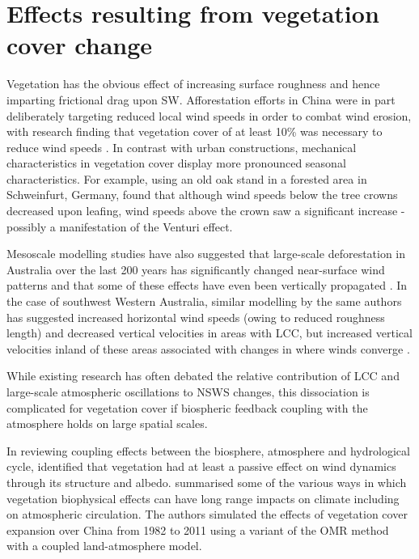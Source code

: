 \section{Effects resulting from vegetation cover change}

Vegetation has the obvious effect of increasing surface roughness and hence imparting frictional drag upon \ac{SW}. Afforestation efforts in China were in part deliberately targeting reduced local wind speeds in order to combat wind erosion, with research finding that vegetation cover of at least 10\% was necessary to reduce wind speeds \citep{jiang2019}. In contrast with urban constructions, mechanical characteristics in vegetation cover display more pronounced seasonal characteristics. For example, using an old oak stand in a forested area in Schweinfurt, Germany, \citet{geiger1950} found that although wind speeds below the tree crowns decreased upon leafing, wind speeds above the crown saw a significant increase - possibly a manifestation of the Venturi effect.

Mesoscale modelling studies have also suggested that large-scale deforestation in Australia over the last 200 years has significantly changed near-surface wind patterns and that some of these effects have even been vertically propagated \citep{narisma2003}. In the case of southwest Western Australia, similar modelling by the same authors has suggested increased horizontal wind speeds (owing to reduced roughness length) and decreased vertical velocities in areas with \ac{LCC}, but increased vertical velocities inland of these areas associated with changes in where winds converge \citep{pitman2004}.

While existing research has often debated the relative contribution of \ac{LCC} and large-scale atmospheric oscillations to NSWS changes, this dissociation is complicated for vegetation cover if biospheric feedback coupling with the atmosphere holds on large spatial scales.

In reviewing coupling effects between the biosphere, atmosphere and hydrological cycle, \citet{hutjes1998} identified that vegetation had at least a passive effect on wind dynamics through its structure and albedo. \citet{li2020} summarised some of the various ways in which vegetation biophysical effects can have long range impacts on climate including on atmospheric circulation. The authors simulated the effects of vegetation cover expansion over China from 1982 to 2011 using a variant of the \ac{OMR} method with a coupled land-atmosphere model.

